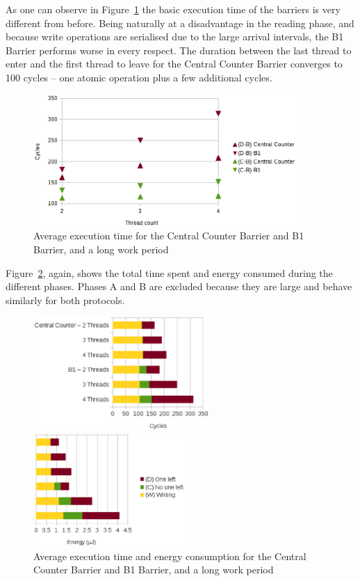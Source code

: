 \documentclass[a4paper, 10pt]{article}
\begin{document}
As one can observe in Figure~\ref{fig:c1-time-work-1000-B-C-D} the basic execution time of the barriers is very different from before.
Being naturally at a disadvantage in the reading phase, and because write operations are serialised due to the large arrival intervals, the B1 Barrier performs worse in every respect.
The duration between the last thread to enter and the first thread to leave for the Central Counter Barrier converges to 100 cycles -- one atomic operation plus a few additional cycles.
\begin{figure}[htbp]
	\centering
	\includegraphics[width=10cm]{charts/c1-time-work-1000-B-C-D}
	\caption{Average execution time for the Central Counter Barrier and B1 Barrier, and a long work period}
	\label{fig:c1-time-work-1000-B-C-D}
\end{figure}

Figure~\ref{fig:c1-work-1000-partition}, again, shows the total time spent and energy consumed during the different phases.
Phases A and B are excluded because they are large and behave similarly for both protocols.
\begin{figure}[htbp]
	\centering
	\begin{minipage}{0.53\linewidth}
		\includegraphics[height=4.3cm]{charts/c1-time-work-1000-partition}
	\end{minipage}
	\begin{minipage}{0.46\linewidth}
		\includegraphics[height=4.3cm]{charts/c1-energy-work-1000-partition}
	\end{minipage}
	\caption{Average execution time and energy consumption for the Central Counter Barrier and B1 Barrier, and a long work period}
	\label{fig:c1-work-1000-partition}
\end{figure}
\end{document}
